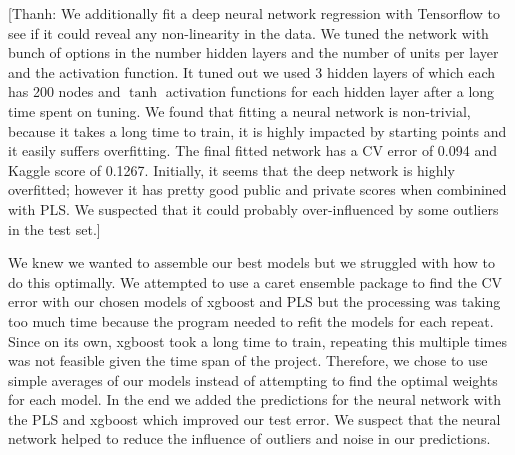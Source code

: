 \documentclass[12pt]{article}
\newcommand{\thanh}[1]{{\color{blue} [Thanh: #1]}}
\begin{document}

\thanh{We additionally fit a deep neural network regression with Tensorflow to see if it could reveal any non-linearity in the data. We tuned the network with bunch of options in the number hidden layers and the number of units per layer and the activation function. It tuned out we used 3 hidden layers of which each has 200 nodes and $\tanh$ activation functions for each hidden layer after a long time spent on tuning. We found that fitting a neural network is non-trivial, because it takes a long time to train, it is highly impacted by starting points and it easily suffers overfitting. The final fitted network has a CV error of 0.094 and Kaggle score of 0.1267. Initially, it seems that the deep network is highly overfitted; however it has pretty good public and private scores when combinined with PLS. We suspected that it could probably over-influenced by some outliers in the test set.} 

We knew we wanted to assemble our best models but we struggled with how to do this optimally.  We attempted to use a caret ensemble package to find the CV error with our chosen models of xgboost and PLS but the processing was taking too much time because the program needed to refit the models for each repeat.  Since on its own, xgboost took a long time to train, repeating this multiple times was not feasible given the time span of the project.  Therefore, we chose to use simple averages of our models instead of attempting to find the optimal weights for each model.  In the end we added the predictions for the neural network with the PLS and xgboost which improved our test error.  We suspect that the neural network helped to reduce the influence of outliers and noise in our predictions.
\end{document}
